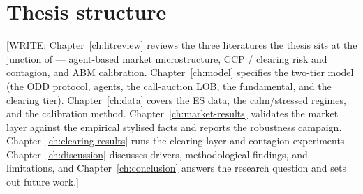 
\section{Thesis structure}
\label{sec:intro-roadmap}

[WRITE: Chapter~\ref{ch:litreview} reviews the three literatures the thesis sits at
the junction of — agent-based market microstructure, CCP / clearing risk and
contagion, and ABM calibration. Chapter~\ref{ch:model} specifies the two-tier model
(the ODD protocol, agents, the call-auction LOB, the fundamental, and the clearing
tier). Chapter~\ref{ch:data} covers the ES data, the calm/stressed regimes, and the
calibration method. Chapter~\ref{ch:market-results} validates the market layer against
the empirical stylised facts and reports the robustness campaign. Chapter~\ref{ch:clearing-results}
runs the clearing-layer and contagion experiments. Chapter~\ref{ch:discussion}
discusses drivers, methodological findings, and limitations, and Chapter~\ref{ch:conclusion}
answers the research question and sets out future work.]

